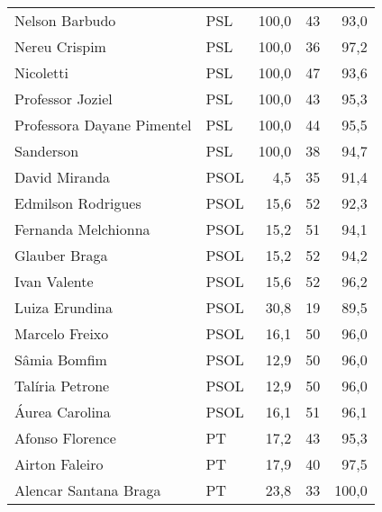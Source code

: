 \begin{longtable}{llrrr}
                      Nelson Barbudo &            PSL &     100,0 &           43 &       93,0 \\
                       Nereu Crispim &            PSL &     100,0 &           36 &       97,2 \\
                           Nicoletti &            PSL &     100,0 &           47 &       93,6 \\
                    Professor Joziel &            PSL &     100,0 &           43 &       95,3 \\
          Professora Dayane Pimentel &            PSL &     100,0 &           44 &       95,5 \\
                           Sanderson &            PSL &     100,0 &           38 &       94,7 \\
                       David Miranda &           PSOL &       4,5 &           35 &       91,4 \\
                  Edmilson Rodrigues &           PSOL &      15,6 &           52 &       92,3 \\
                 Fernanda Melchionna &           PSOL &      15,2 &           51 &       94,1 \\
                       Glauber Braga &           PSOL &      15,2 &           52 &       94,2 \\
                        Ivan Valente &           PSOL &      15,6 &           52 &       96,2 \\
                      Luiza Erundina &           PSOL &      30,8 &           19 &       89,5 \\
                      Marcelo Freixo &           PSOL &      16,1 &           50 &       96,0 \\
                        Sâmia Bomfim &           PSOL &      12,9 &           50 &       96,0 \\
                     Talíria Petrone &           PSOL &      12,9 &           50 &       96,0 \\
                      Áurea Carolina &           PSOL &      16,1 &           51 &       96,1 \\
                     Afonso Florence &             PT &      17,2 &           43 &       95,3 \\
                      Airton Faleiro &             PT &      17,9 &           40 &       97,5 \\
               Alencar Santana Braga &             PT &      23,8 &           33 &      100,0 \\

\end{longtable}
